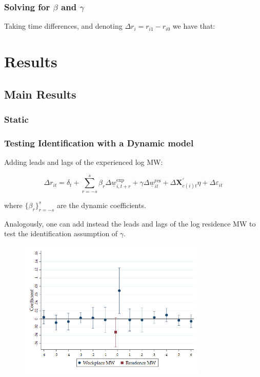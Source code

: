 \documentclass[aspectratio=169, t]{beamer}
\newcommand{\MW}{\underline{w}}
\begin{document}
\begin{frame}
\frametitle{Solving for $\beta$ and $\gamma$}

Taking time differences, and denoting $\Delta r_i = r_{i1} - r_{i0}$ we have that:

\end{frame}

\section{Results}

\subsection{Main Results}

\begin{frame}
    \frametitle{Static }
    
\end{frame}

\begin{frame}[label = dyn_model]
	\frametitle{Testing Identification with a Dynamic model}
	
	Adding leads and lags of the experienced log MW:
	
	$$
	\Delta r_{it} = \delta_t
		+ \sum_{r=-s}^{s} \beta_r \Delta \MW^{\text{exp}}_{i,t+r}
		+ \gamma \Delta \MW^{\text{res}}_{it}
		+ \Delta \mathbf{X}^{'}_{c(i)t}\eta
		+ \Delta \varepsilon_{it}
    $$
	
	where $\{\beta_r\}_{r=-s}^{s}$ are the dynamic coefficients.
	
	\vspace{1mm}

    Analogously, one can add instead the leads and lags of the log residence MW
    to test the identification assumption of $\gamma$.
\end{frame}

\begin{frame}
	\begin{figure}
		\centering
		\vspace{-2mm}
		\includegraphics[width=0.8\textwidth]{fd_baseline/output/fd_baseline_exp_ln_mw_17_dynamic.png}
	\end{figure} 
\end{frame}
\end{document}
